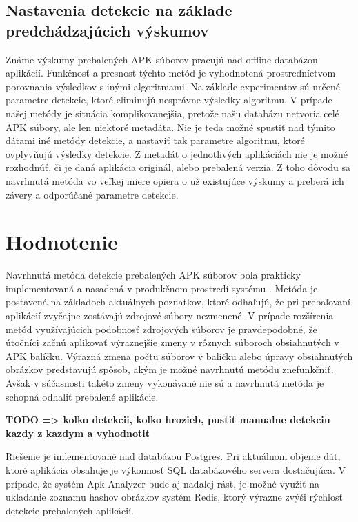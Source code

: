 \subsection*{Nastavenia detekcie na základe predchádzajúcich výskumov}
Známe výskumy prebalených APK súborov pracujú nad offline databázou aplikácií. Funkčnosť a presnosť týchto metód je vyhodnotená prostredníctvom porovnania výsledkov s inými algoritmami. Na základe experimentov sú určené parametre detekcie, ktoré eliminujú nesprávne výsledky algoritmu. V prípade našej metódy je situácia komplikovanejšia, pretože našu databázu netvoria celé APK súbory, ale len niektoré metadáta. Nie je teda možné spustiť nad týmito dátami iné metódy detekcie, a nastaviť tak parametre algoritmu, ktoré ovplyvňujú výsledky detekcie. Z metadát o jednotlivých aplikáciách nie je možné rozhodnúť, či je daná aplikácia originál, alebo prebalená verzia.  Z toho dôvodu sa navrhnutá metóda vo veľkej miere opiera o už existujúce výskumy a preberá ich závery a odporúčané parametre detekcie. 

\section{Hodnotenie}
Navrhnutá metóda detekcie prebalených APK súborov bola prakticky implementovaná a nasadená v produkčnom prostredí systému . 
Metóda je postavená na základoch aktuálnych poznatkov, ktoré odhaľujú, že pri prebaľovaní aplikácií zvyčajne zostávajú zdrojové súbory nezmenené. V prípade rozšírenia metód využívajúcich podobnosť zdrojových súborov je pravdepodobné, že útočníci začnú aplikovať výraznejšie zmeny v rôznych súboroch obsiahnutých v APK balíčku. Výrazná zmena počtu súborov v balíčku alebo úpravy obsiahnutých obrázkov predstavujú spôsob, akým je možné navrhnutú metódu znefunkčniť. Avšak v súčasnosti takéto zmeny vykonávané nie sú a navrhnutá metóda je schopná odhaliť prebalené aplikácie.

\textbf{TODO => kolko detekcii, kolko hrozieb, pustit manualne detekciu kazdy z kazdym a vyhodnotit}
 
Riešenie je imlementované nad databázou Postgres. Pri aktuálnom objeme dát, ktoré aplikácia obsahuje je výkonnosť SQL databázového servera dostačujúca. V prípade, že systém Apk Analyzer bude aj naďalej rásť, je možné využiť na ukladanie zoznamu hashov obrázkov systém Redis, ktorý výrazne zvýši rýchlosť detekcie prebalených aplikácií.